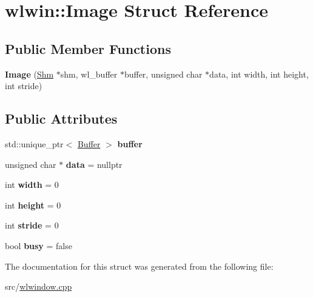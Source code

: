 \hypertarget{structwlwin_1_1Image}{}\section{wlwin\+::Image Struct Reference}
\label{structwlwin_1_1Image}
\subsection*{Public Member Functions}
\begin{DoxyCompactItemize}
\item 
\mbox{\label{structwlwin_1_1Image_a78668f1de3ca0c2728cfe1e28fa0b3ea}} 
{\bfseries Image} (\mbox{\hyperlink{classwlwin_1_1Shm}{Shm}} $\ast$shm, wl\+\_\+buffer $\ast$buffer, unsigned char $\ast$data, int width, int height, int stride)
\end{DoxyCompactItemize}
\subsection*{Public Attributes}
\begin{DoxyCompactItemize}
\item 
\mbox{\label{structwlwin_1_1Image_aa9d0b00be184a7375d25a3b93016faa3}} 
std\+::unique\+\_\+ptr$<$ \mbox{\hyperlink{classwlwin_1_1Buffer}{Buffer}} $>$ {\bfseries buffer}
\item 
\mbox{\label{structwlwin_1_1Image_ad1f98d771fb6de33a0147cc31dff7aec}} 
unsigned char $\ast$ {\bfseries data} = nullptr
\item 
\mbox{\label{structwlwin_1_1Image_ad8ed66faf34c92e2785b31546ea2d775}} 
int {\bfseries width} = 0
\item 
\mbox{\label{structwlwin_1_1Image_aabde0120b6102805d56bbce4a647380f}} 
int {\bfseries height} = 0
\item 
\mbox{\label{structwlwin_1_1Image_ab435a819f98874ef84b37e16c4b1ab7e}} 
int {\bfseries stride} = 0
\item 
\mbox{\label{structwlwin_1_1Image_ad08d5e5760dc0649557417b688fb95c6}} 
bool {\bfseries busy} = false
\end{DoxyCompactItemize}


The documentation for this struct was generated from the following file\+:\begin{DoxyCompactItemize}
\item 
src/\mbox{\hyperlink{wlwindow_8cpp}{wlwindow.\+cpp}}\end{DoxyCompactItemize}
